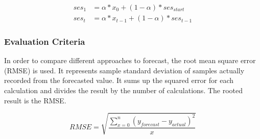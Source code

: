 \begin{equation}
  \begin{align}
  	ses_1 &= \alpha * x_{0} + (1 - \alpha) * ses_{start} \\
  	ses_t&=\alpha*x_{t-1}+(1-\alpha)*ses_{t-1}
  \end{align}
\end{equation}


\subsubsection{Evaluation Criteria}
In order to compare different approaches to forecast, the root mean square error (RMSE) is used. It represents sample standard deviation of samples actually recorded from the forecasted value. It sums up the squared error for each calculation and divides the result by the number of calculations.\newline
The rooted result is the RMSE.
\begin{center}
\begin{equation}
RMSE = \sqrt{\frac{\sum^{n}_{x=0}{(y_{forecast} - y_{actual})^{2}}}{x}}
\end{equation}
\end{center}
